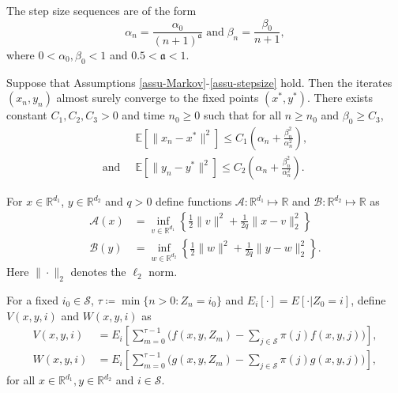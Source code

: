 \documentclass[10pt,a4paper]{amsart}
\newcommand{\Acal}{\mathcal{A}}
\newcommand{\Bcal}{\mathcal{B}}
\newcommand{\EE}{\mathbb{E}}
\newcommand{\RR}{\mathbb{R}}
\newcommand{\Scal}{\mathcal{S}}
\newcommand{\afrak}{\mathfrak{a}}
\newcommand{\xstar}{x^*}
\newcommand{\ystar}{y^*}
\begin{document}
\begin{assumption}\label{assu-stepsize}
The step size sequences are of the form $$\alpha_n=\frac{\alpha_0}{(n+1)^{\afrak}}\;\text{and}\;\beta_n=\frac{\beta_0}{n+1},$$
where $0<\alpha_0,\beta_0<1$ and $0.5<\afrak<1$. 
\end{assumption}

\begin{theorem}\label{thm:expectation-bound}
    Suppose that Assumptions \ref{assu-Markov}-\ref{assu-stepsize} hold. Then the iterates $(x_n,y_n)$ almost surely converge to the fixed points $(\xstar,\ystar)$. There exists constant $C_1,C_2,C_3>0$ and time $n_0\geq 0$ such that for all $n\geq n_0$ and $\beta_0\geq C_3$,
    \begin{align*}
        &\EE\left[\|x_n-\xstar\|^2\right]\leq C_1\left(\alpha_n+\frac{\beta_n^2}{\alpha_n^2}\right),\\
    \text{and}\;\;&\EE\left[\|y_n-\ystar\|^2\right]\leq C_2\left(\alpha_n+\frac{\beta_n^2}{\alpha_n^2}\right).
    \end{align*}
\end{theorem}

\begin{definition}\label{defn:Moreau}
    For $x\in\RR^{d_1}$, $y\in\RR^{d_2}$ and $q>0$ define functions $\Acal:\RR^{d_1}\mapsto\RR$ and $\Bcal:\RR^{d_2}\mapsto\RR$ as 
\begin{align*}
\Acal(x)&=\inf_{v\in\RR^{d_1}}\left\{\frac{1}{2}\|v\|^2+\frac{1}{2q}\|x-v\|_2^2\right\}    \\
\Bcal(y)&=\inf_{w\in\RR^{d_2}}\left\{\frac{1}{2}\|w\|^2+\frac{1}{2q}\|y-w\|_2^2\right\}.   
\end{align*}
Here $\|\cdot\|_2$ denotes the $\ell_2$ norm. 
\end{definition}

\begin{definition}\label{defn:VandW}
    For a fixed $i_0\in\Scal$, $\tau\coloneqq \min\{n>0: \!Z_n=i_0\}$ and $E_i[\cdot]=E[\cdot|Z_0=i]$, define $V(x,y,i)$ and $W(x,y,i)$ as
    \begin{align*}
        V(x,y,i)&=E_i\left[\sum_{m=0}^{\tau-1}\Big(f(x,y,Z_m)-\sum_{j\in\Scal}\pi(j)f(x,y,j)\Big)\right],\\
        W(x,y,i)&=E_i\left[\sum_{m=0}^{\tau-1}\Big(g(x,y,Z_m)-\sum_{j\in\Scal}\pi(j)g(x,y,j)\Big)\right],
    \end{align*}
for all $x\in\RR^{d_1},y\in\RR^{d_2}$ and $i\in\Scal$.
\end{definition}
\end{document}
